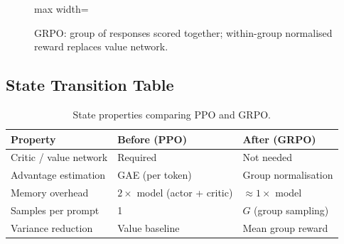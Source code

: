 \documentclass{article}
\begin{document}
\begin{figure}[h]
\centering
\begin{adjustbox}{max width=\linewidth}
\end{adjustbox}
\caption{GRPO: group of responses scored together; within-group normalised reward replaces value network.}
\end{figure}

\subsection{State Transition Table}
\begin{table}[h]\centering
\begin{tabular}{lll}\toprule
\textbf{Property} & \textbf{Before (PPO)} & \textbf{After (GRPO)}\\\midrule
Critic / value network & Required & Not needed\\
Advantage estimation & GAE (per token) & Group normalisation\\
Memory overhead & $2\times$ model (actor + critic) & $\approx 1\times$ model\\
Samples per prompt & 1 & $G$ (group sampling)\\
Variance reduction & Value baseline & Mean group reward\\\bottomrule
\end{tabular}
\caption{State properties comparing PPO and GRPO.}
\end{table}
\end{document}
